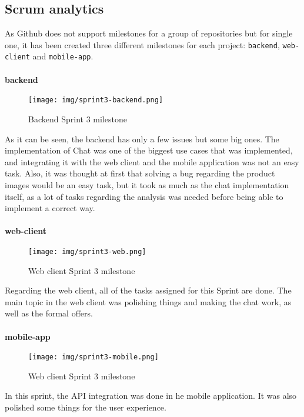 \documentclass[./main.tex]{subfiles}
\begin{document}
\subsection{Scrum analytics}
As Github does not support milestones for a group of repositories but for single one, it has been created three different milestones for each project: \texttt{backend}, \texttt{web-client} and \texttt{mobile-app}.
\\
\\
\textbf{backend}
\begin{figure}[H]
	\centering
	\texttt{[image: img/sprint3-backend.png]}
	\caption{Backend Sprint 3 milestone}
\end{figure}
As it can be seen, the backend has only a few issues but some big ones. The implementation of Chat was one of the biggest use cases that was implemented, and integrating it with the web client and the mobile application was not an easy task. Also, it was thought at first that solving a bug regarding the product images would be an easy task, but it took as much as the chat implementation itself, as a lot of tasks regarding the analysis was needed before being able to implement a correct way.
\\
\\
\textbf{web-client}
\begin{figure}[H]
	\centering
	\texttt{[image: img/sprint3-web.png]}
	\caption{Web client Sprint 3 milestone}
\end{figure}
Regarding the web client, all of the tasks assigned for this Sprint are done.  The main topic in the web client was polishing things and making the chat work, as well as the formal offers.
\\\\
\textbf{mobile-app}
\begin{figure}[H]
	\centering
	\texttt{[image: img/sprint3-mobile.png]}
	\caption{Web client Sprint 3 milestone}
\end{figure}
In this sprint, the API integration was  done in he mobile application. It was also polished some things for the user experience.
\end{document}
